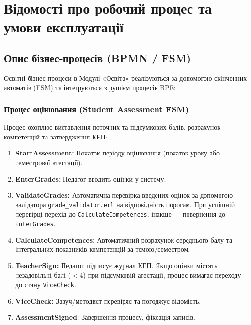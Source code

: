 \documentclass{article}
\begin{document}
\newpage
\section{Відомості про робочий процес та умови експлуатації}

\subsection{Опис бізнес-процесів (BPMN / FSM)}
Освітні бізнес-процеси в Модулі «Освіта» реалізуються за допомогою скінченних автоматів (FSM) та інтегруються з рушієм процесів BPE:

\subsubsection{Процес оцінювання (Student Assessment FSM)}
Процес охоплює виставлення поточних та підсумкових балів, розрахунок компетенцій та затвердження КЕП:
\begin{enumerate}
    \item \textbf{StartAssessment:} Початок періоду оцінювання (початок уроку або семестрової атестації).
    \item \textbf{EnterGrades:} Педагог вводить оцінки у систему.
    \item \textbf{ValidateGrades:} Автоматична перевірка введених оцінок за допомогою валідатора \texttt{grade\_}\-\texttt{validator.erl} на відповідність порогам. При успішній перевірці перехід до \texttt{CalculateCompetences}, інакше --- повернення до \texttt{EnterGrades}.
    \item \textbf{CalculateCompetences:} Автоматичний розрахунок середнього балу та інтегральних показників компетенцій за темою/семестром.
    \item \textbf{TeacherSign:} Педагог підписує журнал КЕП. Якщо оцінки містять незадовільні балі ($<4$) при підсумковій атестації, процес вимагає переходу до стану \texttt{ViceCheck}.
    \item \textbf{ViceCheck:} Завуч/методист перевіряє та погоджує відомість.
    \item \textbf{AssessmentSigned:} Завершення процесу, фіксація записів.
\end{enumerate}
\end{document}
